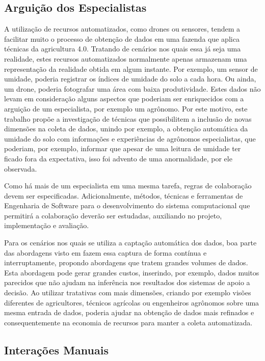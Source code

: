 \documentclass[12pt]{article}
\begin{document}
\subsection{Arguição dos Especialistas}
\label{subsec:arquicao_especialistas}

A utilização de recursos automatizados, como drones ou sensores, tendem a facilitar muito o processo de obtenção de dados em uma fazenda que aplica técnicas da agricultura 4.0. Tratando de cenários nos quais essa já seja uma realidade, estes recursos automatizados normalmente apenas armazenam uma representação da realidade obtida em algum instante. Por exemplo, um sensor de umidade, poderia registrar os índices de umidade do solo a cada hora. Ou ainda, um drone, poderia fotografar uma área com baixa produtividade. Estes dados não levam em consideração alguns aspectos que poderiam ser enriquecidos com a arguição de um especialista, por exemplo um agrônomo. Por este motivo, este trabalho propõe a investigação de técnicas que possibilitem a inclusão de novas dimensões na coleta de dados, unindo por exemplo, a obtenção automática da umidade do solo com informações e experiências de agrônomos especialistas, que poderiam, por exemplo, informar que apesar de uma leitura de umidade ter ficado fora da expectativa, isso foi advento de uma anormalidade, por ele observada. 

Como há mais de um especialista em uma mesma tarefa, regras de colaboração devem ser especificadas. Adicionalmente, métodos, técnicas e ferramentas de Engenharia de Software para o desenvolvimento do sistema computacional que permitirá a colaboração deverão ser estudadas, auxiliando no projeto, implementação e avaliação.

Para os cenários nos quais se utiliza a captação automática dos dados, boa parte das abordagens visto em \cite{Massruha:2017} fazem essa captura de forma contínua e interruptamente, propondo abordagens que tratem grandes volumes de dados. Esta abordagem pode gerar grandes custos, inserindo, por exemplo, dados muitos parecidos que não ajudam na inferência nos resultados dos sistemas de apoio a decisão. Ao utilizar tratativas com mais dimensões, criando por exemplo visões diferentes de agricultores, técnicos agrícolas ou engenheiros agrônomos sobre uma mesma entrada de dados, poderia ajudar na obtenção de dados mais refinados e consequentemente na economia de recursos para manter a coleta automatizada.

\subsection{Interações Manuais}
\label{subsec:interacoes_manuais}
\end{document}
